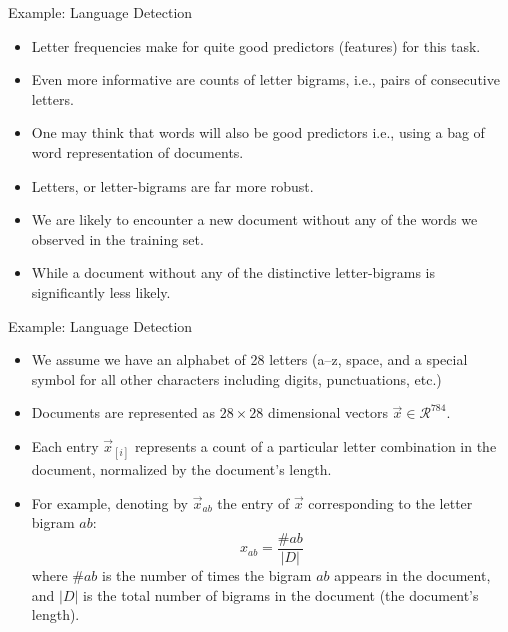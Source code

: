 \documentclass[handout]{beamer}
\begin{document}
\begin{frame}{Example: Language Detection}
\begin{scriptsize}
\begin{itemize}

\item Letter frequencies make for quite good predictors (features) for this task.
\item Even more informative are counts of letter bigrams, i.e., pairs of consecutive letters.
\item One may think that words will also be good predictors i.e., using a bag of word representation of documents.
\item Letters, or letter-bigrams are far more robust.
\item We are likely to encounter a new document without any of the words we observed in the training set.
\item While a document without any of the distinctive letter-bigrams is significantly less likely. \cite{goldberg2017neural}
\end{itemize}


\end{scriptsize}
\end{frame}



\begin{frame}{Example: Language Detection}
\begin{scriptsize}
\begin{itemize}
\item We assume we have an alphabet of 28 letters (a–z, space, and a special symbol for all other characters including digits, punctuations, etc.)
\item Documents are represented as $28\times28$ dimensional vectors $\vec{x} \in \mathcal{R}^{784}$.
\item Each entry $\vec{x}_{[i]}$  represents a count of a particular letter combination in the document, normalized by the document's length.
\item For example, denoting by $\vec{x}_{ab}$ the entry of $\vec{x}$ corresponding to the letter bigram $ab$:
\begin{equation}
 x_{ab}= \frac{\#ab}{|D|}
\end{equation}
where $\#ab$ is the number of times the bigram $ab$ appears in the document, and $|D|$ is the total number of bigrams in the document (the document’s length).


\end{itemize}


\end{scriptsize}
\end{frame}
\end{document}
